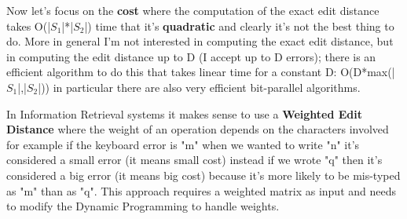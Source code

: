Now let's focus on the \textbf{cost} where the computation of the exact edit distance takes O(|$S_1$|*|$S_2$|) time that it's \textbf{quadratic} and clearly it's not the best thing to do. More in general I'm not interested in computing the exact edit distance, but in computing the edit distance up to D (I accept up to D errors); there is an efficient algorithm to do this that takes linear time for a constant D: O(D*max(|$S_1$|,|$S_2$|)) in particular there are also very efficient bit-parallel algorithms.\newline


In Information Retrieval systems it makes sense to use a \textbf{Weighted Edit Distance} where the weight of an operation depends on the characters involved for example if the keyboard error is "m" when we wanted to write "n" it's considered a small error (it means small cost) instead if we wrote "q" then it's considered a big error (it means big cost) because it's more likely to be mis-typed as "m" than as "q". This approach requires a weighted matrix as input and needs to modify the Dynamic Programming to handle weights.\newline
